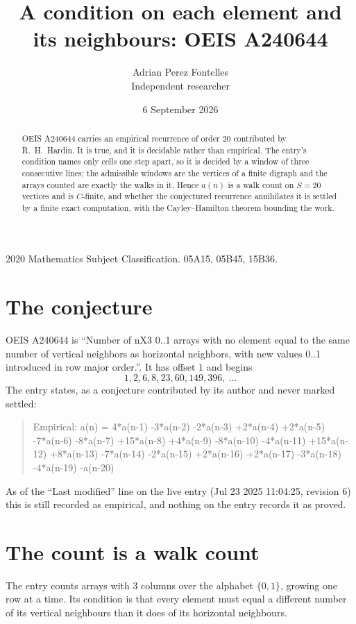 \documentclass[11pt,a4paper]{article}
\title{A condition on each element and its neighbours: OEIS A240644}
\author{Adrian Perez Fontelles\\ \small Independent researcher}
\date{6 September 2026}
\theoremstyle{plain}
\theoremstyle{definition}
\begin{document}
\maketitle

\begin{abstract}
OEIS A240644 carries an empirical recurrence of order $20$ contributed by R.~H.~Hardin. It is
true, and it is decidable rather than empirical. The entry's condition names only cells one step apart, so it is decided by a window of
three consecutive lines; the
admissible windows are the vertices of a finite digraph and the arrays counted are exactly the
walks in it. Hence $a(n)$ is a walk count on $S=20$ vertices and is $C$-finite, and whether the
conjectured recurrence annihilates it is settled by a finite exact computation, with the
Cayley--Hamilton theorem bounding the work.
\end{abstract}

\noindent\small 2020 Mathematics Subject Classification. 05A15, 05B45, 15B36.\normalsize

\section{The conjecture}

OEIS A240644 is ``Number of nX3 0..1 arrays with no element equal to the same number of vertical neighbors as horizontal neighbors, with new values 0..1 introduced in row major order.''. It has offset $1$ and begins
\[
1, 2, 6, 8, 23, 60, 149, 396,\ \dots
\]
The entry states, as a conjecture contributed by its author and never marked settled:
\begin{quote}
Empirical: a(n) = 4*a(n-1) -3*a(n-2) -2*a(n-3) +2*a(n-4) +2*a(n-5) -7*a(n-6) -8*a(n-7) +15*a(n-8) +4*a(n-9) -8*a(n-10) -4*a(n-11) +15*a(n-12) +8*a(n-13) -7*a(n-14) -2*a(n-15) +2*a(n-16) +2*a(n-17) -3*a(n-18) -4*a(n-19) -a(n-20)
\end{quote}
As of the ``Last modified'' line on the live entry (Jul 23 2025 11:04:25, revision 6) this is still
recorded as empirical, and nothing on the entry records it as proved.

\section{The count is a walk count}

The entry counts arrays with $3$ columns over the alphabet $\{0,1\}$, growing one row at a time. Its condition is that every element must equal a different number of its vertical neighbours than it does of its horizontal neighbours.
\end{document}
